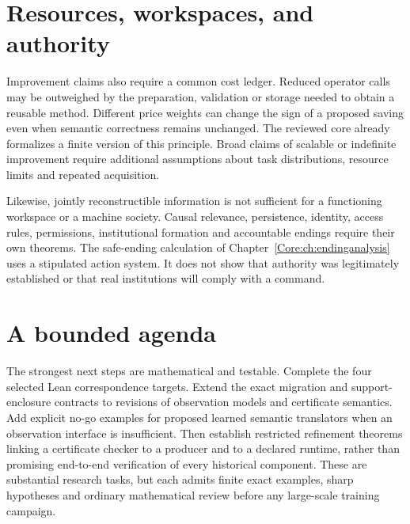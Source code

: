 \section{Resources, workspaces, and authority}
Improvement claims also require a common cost ledger. Reduced operator calls may be outweighed by the preparation, validation or storage needed to obtain a reusable method. Different price weights can change the sign of a proposed saving even when semantic correctness remains unchanged. The reviewed core already formalizes a finite version of this principle. Broad claims of scalable or indefinite improvement require additional assumptions about task distributions, resource limits and repeated acquisition.

Likewise, jointly reconstructible information is not sufficient for a functioning workspace or a machine society. Causal relevance, persistence, identity, access rules, permissions, institutional formation and accountable endings require their own theorems. The safe-ending calculation of Chapter~\ref{Core:ch:endinganalysis} uses a stipulated action system. It does not show that authority was legitimately established or that real institutions will comply with a command.

\section{A bounded agenda}
The strongest next steps are mathematical and testable. Complete the four selected Lean correspondence targets. Extend the exact migration and support-enclosure contracts to revisions of observation models and certificate semantics. Add explicit no-go examples for proposed learned semantic translators when an observation interface is insufficient. Then establish restricted refinement theorems linking a certificate checker to a producer and to a declared runtime, rather than promising end-to-end verification of every historical component. These are substantial research tasks, but each admits finite exact examples, sharp hypotheses and ordinary mathematical review before any large-scale training campaign.
